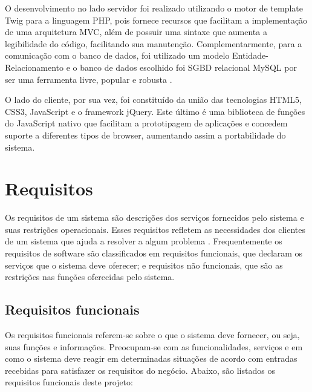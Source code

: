 \documentclass[cic,tc]{iiufrgs}
\begin{document}
O desenvolvimento no lado servidor foi realizado utilizando o motor de template Twig para a linguagem PHP, pois fornece recursos que facilitam a implementação de uma arquitetura MVC, além de possuir uma sintaxe que aumenta a legibilidade do código, facilitando sua manutenção. Complementarmente, para a comunicação com o banco de dados, foi utilizado um modelo Entidade-Relacionamento e o banco de dados escolhido foi SGBD relacional MySQL por ser uma ferramenta livre, popular e robusta \cite{mysql}.

O lado do cliente, por sua vez, foi constituído da união das tecnologias HTML5, CSS3, JavaScript e o framework jQuery. Este último é uma biblioteca de funções do JavaScript nativo que facilitam a prototipagem de aplicações e concedem suporte a diferentes tipos de browser, aumentando assim a portabilidade do sistema.


\section{Requisitos}
\label{metodologiaRequisitos}
Os requisitos de um sistema são descrições dos serviços fornecidos pelo sistema e suas restrições operacionais. Esses requisitos refletem as necessidades dos clientes de um sistema que ajuda a resolver a algum problema \cite{sommerville}. Frequentemente os requisitos de software são classificados em requisitos funcionais, que declaram os serviços que o sistema deve oferecer; e requisitos não funcionais, que são as restrições nas funções oferecidas pelo sistema. 

\subsection{Requisitos funcionais}
\label{requisitosRF}
Os requisitos funcionais referem-se sobre o que o sistema deve fornecer, ou seja, suas funções e informações. Preocupam-se com as funcionalidades, serviços e em como o sistema deve reagir em determinadas situações de acordo com entradas recebidas para satisfazer os requisitos do negócio. Abaixo, são listados os requisitos funcionais deste projeto:  
\end{document}
